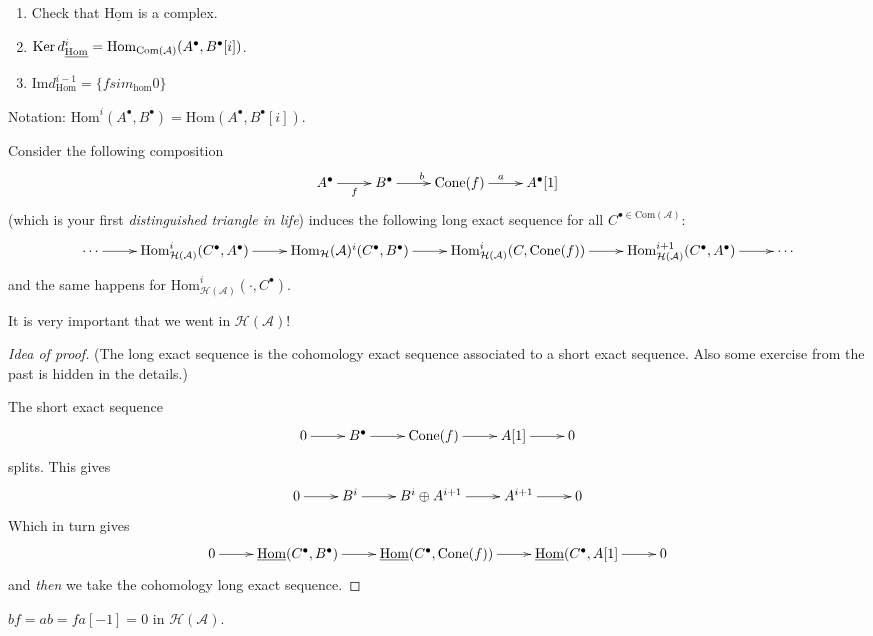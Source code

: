 \begin{exercise}
\label{exercise-Hom}
\begin{enumerate}
\item Check that $\underline{\text{Hom}}$ is a complex.
\item $\mathop{\mathrm{Ker}}
d^i_{\underline{\text{Hom}}}
=\text{Hom}_{\text{Com}(\mathcal{A})}(A^{\bullet},B^{\bullet}[i])$.
\item $\text{Im}d^{i-1}_{\text{Hom}}=\{fsim_{\text{hom}}0\}$
\end{enumerate}
\end{exercise}

Notation:
$\text{Hom}^i(A^{\bullet},B^{\bullet})=\text{Hom}(A^{\bullet},B^{\bullet}[i])$. 

\begin{lemma}
\label{lemma-cone-long-exact-sequence}
Consider the following composition
$$
\xymatrix{
A^\bullet\ar[r]_f&  B^{\bullet}\ar[r]^b&  \text{Cone}(f)\ar[r]^a &
A^{\bullet}[1]
}
$$
(which is your first {\it distinguished triangle in life}) induces the following
long exact sequence for all $C^{\bullet \in \text{Com}(\mathcal{A})}$:
$$
\xymatrix{
\cdots\ar[r]&\text{Hom}^i_{\mathcal{H}(\mathcal{A})}(C^{\bullet},A^{\bullet})\ar[r]&\text{Hom}_{\mathcal{H}}(\mathcal{A})^i(C^{\bullet},B^{\bullet})\ar[r]&\text{Hom}^i_{\mathcal{H}(\mathcal{A})}(C,\text{Cone}(f))\ar[r]&\text{Hom}^{i+1}_{\mathcal{H}(\mathcal{A})}(C^{\bullet},A^{\bullet})\ar[r]&\cdots
}
$$
and the same happens for
$\text{Hom}^i_{\mathcal{H}(\mathcal{A})}(\cdot,C^{\bullet})$.
\end{lemma}

It is very important that we went in $\mathcal{H}(\mathcal{A})$!

\begin{proof}[Idea of proof]
(The long exact sequence is the cohomology exact sequence associated
to a short exact sequence. Also some exercise from the past is hidden in the
details.)

The short exact sequence
$$
\xymatrix{
0\ar[r]&B^{\bullet}\ar[r]&\text{Cone}(f)\ar[r]&A[1]\ar[r]&0
}
$$
splits. This gives
$$
\xymatrix{
0\ar[r]&B^i\ar[r]&B^i\oplus A^{i+1}\ar[r]&A^{i+1}\ar[r]&0
}
$$
Which in turn gives
$$
\xymatrix{
0\ar[r]&\underline{\text{Hom}}(C^{\bullet},B^{\bullet})
\ar[r]&\underline{\text{Hom}}(C^{\bullet},\text{Cone}(f))
\ar[r]&\underline{\text{Hom}}(C^{\bullet},A[1]\ar[r]&0
}
$$
and {\it then} we take the cohomology long exact sequence.
\end{proof}

\begin{exercise}
\label{exercise-simple}
$bf=ab=fa[-1]=0$ in $\mathcal{H}(\mathcal{A})$.
\end{exercise}


